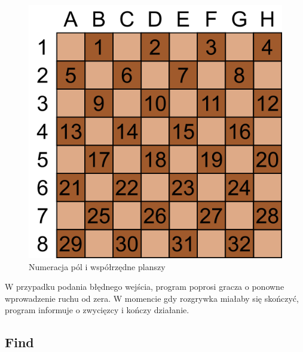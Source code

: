 \FloatBarrier

\begin{figure}
    \centering
    \includegraphics[scale=.6]{graphics/warcaby_planszaNumerowana.png}
    \caption{Numeracja pól i współrzędne planszy}
    \label{fig:numer}
\end{figure}


W przypadku podania błędnego wejścia, program poprosi gracza o ponowne wprowadzenie ruchu od zera. W momencie gdy rozgrywka miałaby się skończyć, program informuje o zwycięzcy i kończy działanie.

\subsection{Find}

